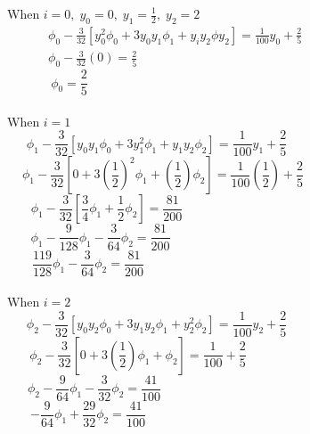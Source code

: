\documentclass[a4paper,12pt]{report}
\newcommand{\sps}{\\[0.2cm]}
\begin{document}
	When $\displaystyle i=0, \; y_0=0, \; y_1=\frac{1}{2}, \; y_2=2$
	\begin{eqnarray*}
		\phi_0 - \frac{3}{32}\left[y_0^2\phi_0 + 3y_0y_1\phi_1 + y_iy_2\phi y_2 \right] = \frac{1}{100}y_0 + \frac{2}{5}\quad\quad\quad\quad\quad\quad\quad\quad\sps
		\phi_0 - \frac{3}{32}(0) = \frac{2}{5}\quad\quad\quad\quad\quad\quad\quad\quad\quad\quad\quad\quad\quad\quad\quad\quad\quad\quad\quad\quad\quad\quad\;
	\end{eqnarray*}
	\begin{equation}
		\phi_0=\frac{2}{5} \tag{i}\quad\quad\quad\quad\quad\quad\quad\quad\quad\quad\quad\quad\quad\quad\quad\quad\quad\quad\quad\quad\quad\quad\quad\quad\quad\quad
	\end{equation}
	\\When $i=1$
	$$
		\phi_1 - \frac{3}{32} \left[y_0y_1 \phi_0 + 3y_1^2\phi_1 + y_1y_2\phi_2\right] = \frac{1}{100}y_1 + \frac{2}{5}\quad\quad\quad\quad\quad\quad\quad\quad\quad\quad\quad\quad
	$$
	$$
		\phi_1 - \frac{3}{32}\left[0 + 3\left(\frac{1}{2}\right)^2\phi_1 + \left(\frac{1}{2}\right)\phi_2\right] = \frac{1}{100}\left(\frac{1}{2}\right) + \frac{2}{5}\quad\quad\quad\quad\quad\quad\quad\quad\quad\quad\quad
	$$
	$$
		\phi_1 - \frac{3}{32}\left[\frac{3}{4}\phi_1 + \frac{1}{2}\phi_2\right] = \frac{81}{200}\quad\quad\quad\quad\quad\quad\quad\quad\quad\quad\quad\quad\quad\quad\quad\quad\quad\quad\quad\quad
	$$
	$$
		\phi_1 - \frac{9}{128}\phi_1 - \frac{3}{64}\phi_2 = \frac{81}{200}\quad\quad\quad\quad\quad\quad\quad\quad\quad\quad\quad\quad\quad\quad\quad\quad\quad\quad\quad\quad\quad
	$$
	\begin{equation}
		\frac{119}{128}\phi_1 - \frac{3}{64}\phi_2 = \frac{81}{200}\quad\quad\quad\quad\quad\quad\quad\quad\quad\quad\quad\quad\quad\quad\quad\quad\quad\quad\quad\quad\quad\quad\quad \tag{ii}
	\end{equation}
	\\When $i=2$
	$$
		\phi_2 - \frac{3}{32} \left[y_0y_2 \phi_0 + 3y_1y_2\phi_1 + y_2^2\phi_2\right] = \frac{1}{100}y_2 + \frac{2}{5}\quad\quad\quad\quad\quad\quad\quad\quad\quad\quad\quad\quad
	$$
	$$
		\phi_2 - \frac{3}{32}\left[0 + 3\left(\frac{1}{2}\right)\phi_1 + \phi_2\right] = \frac{1}{100} + \frac{2}{5}\quad\quad\quad\quad\quad\quad\quad\quad\quad\quad\quad\quad\quad\quad\quad
	$$
	$$
		\phi_2 - \frac{9}{64}\phi_1 - \frac{3}{32}\phi_2 = \frac{41}{100}\quad\quad\quad\quad\quad\quad\quad\quad\quad\quad\quad\quad\quad\quad\quad\quad\quad\quad\quad\quad\quad\quad
	$$
	\begin{equation}
		-\frac{9}{64}\phi_1 + \frac{29}{32}\phi_2 = \frac{41}{100}\quad\quad\quad\quad\quad\quad\quad\quad\quad\quad\quad\quad\quad\quad\quad\quad\quad\quad\quad\quad\quad\quad\quad \tag{iii}
	\end{equation}
\end{document}

